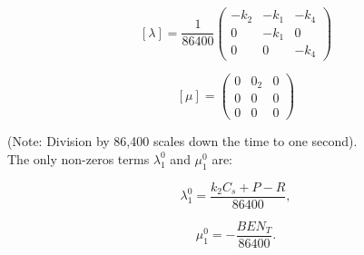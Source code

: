 $$  [\lambda] = \frac{1}{86400}
  \begin{pmatrix}
    -k_2 & -k_1  & -k_4 \\
     0   & -k_1  & 0    \\
     0   &  0    & -k_4
  \end{pmatrix}
$$
  
$$
  [\mu] = 
  \begin{pmatrix}
     0  & 0_2 & 0 \\
     0  & 0   & 0 \\
     0  & 0   & 0
  \end{pmatrix}
$$  

(Note: Division by 86,400 scales down the time to one second).\\

The only non-zeros terms $ \lambda_1^0$ and $ \mu_1^0$ are:

\begin{equation}
  \lambda_1^0 = \frac{k_2 C_s + P - R}{86400},
\end{equation}

\begin{equation}
  \mu_1^0 = -\frac{BEN_T}{86400}.
\end{equation}
